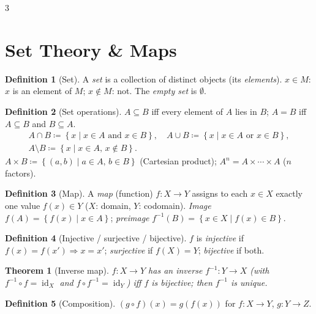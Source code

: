 \documentclass[10pt,a4paper,landscape]{article}
\theoremstyle{definition}
\newtheorem{defn}{Definition}[section]
\theoremstyle{plain}
\newtheorem{thm}{Theorem}[section]
\theoremstyle{remark}
\newcommand{\id}{\operatorname{id}}
\newcommand{\set}[1]{\left\{ #1 \right\}}
\newcommand{\deq}{\coloneqq}
\newcommand{\comp}{\circ}
\begin{document}
\begin{multicols*}{3}

\section{Set Theory \& Maps}

\begin{defn}[Set]
A \emph{set} is a collection of distinct objects (its \emph{elements}). $x \in M$: $x$ is an element of $M$; $x \notin M$: not. The \emph{empty set} is $\emptyset$.
\end{defn}

\begin{defn}[Set operations]
$A \subseteq B$ iff every element of $A$ lies in $B$; $A = B$ iff $A \subseteq B$ and $B \subseteq A$.
{\footnotesize\[
\begin{gathered}
A \cap B \deq \set{x \mid x \in A \text{ and } x \in B},\quad
A \cup B \deq \set{x \mid x \in A \text{ or } x \in B},\\
A \setminus B \deq \set{x \mid x \in A,\, x \notin B}.
\end{gathered}
\]}
$A \times B \deq \set{(a,b) \mid a \in A,\, b \in B}$ (Cartesian product); $A^n = A \times \cdots \times A$ ($n$ factors).
\end{defn}

\begin{defn}[Map]
A \emph{map} (function) $f: X \to Y$ assigns to each $x \in X$ exactly one value $f(x) \in Y$ ($X$: domain, $Y$: codomain). \emph{Image} $f(A) = \set{f(x) \mid x \in A}$; \emph{preimage} $f^{-1}(B) = \set{x \in X \mid f(x) \in B}$.
\end{defn}

\begin{defn}[Injective / surjective / bijective]
$f$ is \emph{injective} if $f(x)=f(x') \Rightarrow x=x'$; \emph{surjective} if $f(X)=Y$; \emph{bijective} if both.
\end{defn}

\begin{thm}[Inverse map]
$f: X \to Y$ has an inverse $f^{-1}: Y \to X$ (with $f^{-1}\comp f = \id_X$ and $f \comp f^{-1} = \id_Y$) iff $f$ is bijective; then $f^{-1}$ is unique.
\end{thm}

\begin{defn}[Composition]
$(g \comp f)(x) = g(f(x))$ for $f: X \to Y$, $g: Y \to Z$.
\end{defn}


\end{multicols*}
\end{document}
